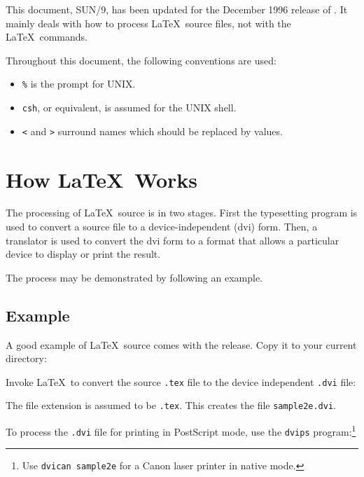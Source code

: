 \documentclass[11pt,twoside,nolof]{starlink}
\begin{document}
This document, SUN/9, has been updated for the December 1996 release of \LaTeXe.
It mainly deals with how to process \LaTeX\
source files, not with the \LaTeX\ commands.

Throughout this document, the following conventions are used:

\begin{itemize}
  \item \texttt{\%} is the prompt for UNIX.
  \item \texttt{csh}, or equivalent, is assumed for the UNIX shell.
  \item \texttt{<} and \texttt{>} surround names which should be replaced
        by values.
\end{itemize}

\section{\label{how_latex_works}How \LaTeX\ Works}

The processing of \LaTeX\ source is in two stages. First the
typesetting program is used to convert a source file to a device-independent
(dvi) form. Then, a translator is used to convert the dvi form to a format that
allows a particular device to display or print the result.

The process may be demonstrated by following an example.

\subsection{Example}
\label{se:example}
A good example of \LaTeX\ source comes with the release.
Copy it to your current directory:
\begin{terminalv}
\end{terminalv}
Invoke \LaTeX\ to convert the source
\texttt{.tex} file to the device independent \texttt{.dvi} file:
\begin{terminalv}
\end{terminalv}
The file extension is assumed to be \texttt{.tex}.
This creates the file \texttt{sample2e.dvi}.

To process the \texttt{.dvi} file for printing in PostScript mode,
use the \texttt{dvips} program:\footnote{Use \texttt{dvican sample2e}
for a Canon laser printer in native mode.}

\begin{terminalv}
\end{terminalv}
\end{document}
